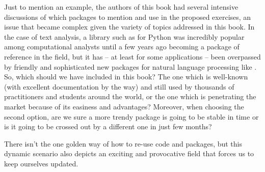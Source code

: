 Just to mention an example, the authors of this book had several intensive discussions of which packages to mention and use in the proposed exercises, an issue that became complex given the variety of topics addressed in this book. In the case of text analysis, a library such as  for Python was incredibly popular among computational analysts until a few years ago becoming a package of reference in the field, but it has -- at least for some applications -- been overpassed by friendly and sophisticated new packages for natural language processing like . So, which should we have included in this book? The one which is well-known (with excellent documentation by the way) and still used by thousands of practitioners and students around the world, or the one which is penetrating the market because of its easiness and advantages? Moreover, when choosing the second option, are we sure a more trendy package is going to be stable in time or is it going to be crossed out by a different one in just few months?  

There isn't the one golden way of how to re-use code and packages, but this dynamic scenario also depicts an exciting and provocative field that forces us to keep ourselves updated.
